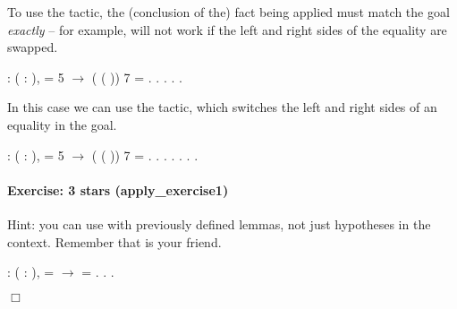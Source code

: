 \documentclass[12pt]{report}
\begin{document}
 To use the  tactic, the (conclusion of the) fact
    being applied must match the goal \textit{exactly} -- for example, 
    will not work if the left and right sides of the equality are
    swapped. \begin{coqdoccode}
\coqdocemptyline
\coqdocnoindent
{}  : \coqdockw{\ensuremath{\forall}} ( : ),\coqdoceol
\coqdocindent{2.50em}
 =   5  \ensuremath{\rightarrow}\coqdoceol
\coqdocindent{2.50em}
 ( ( )) 7 = .\coqdoceol
\coqdocnoindent
{}.\coqdoceol
\coqdocindent{1.00em}
  .\coqdoceol
\coqdocindent{1.00em}
.\coqdoceol
\coqdocnoindent
{}.\coqdoceol
\coqdocemptyline
\end{coqdoccode}
In this case we can use the  tactic, which switches the
    left and right sides of an equality in the goal. \begin{coqdoccode}
\coqdocemptyline
\coqdocnoindent
{}  : \coqdockw{\ensuremath{\forall}} ( : ),\coqdoceol
\coqdocindent{2.50em}
 =   5  \ensuremath{\rightarrow}\coqdoceol
\coqdocindent{2.50em}
 ( ( )) 7 = .\coqdoceol
\coqdocnoindent
{}.\coqdoceol
\coqdocindent{1.00em}
  .\coqdoceol
\coqdocindent{1.00em}
.\coqdoceol
\coqdocindent{1.00em}
. \coqdocindent{1.00em}
 . .\coqdoceol
\coqdocemptyline
\end{coqdoccode}
\paragraph{Exercise: 3 stars (apply\_exercise1)}

 Hint: you can use  with previously defined lemmas, not
    just hypotheses in the context.  Remember that  is
    your friend. \begin{coqdoccode}
\coqdocemptyline
\coqdocnoindent
{}  : \coqdockw{\ensuremath{\forall}} (  :  ),\coqdoceol
\coqdocindent{2.50em}
 =   \ensuremath{\rightarrow}\coqdoceol
\coqdocindent{2.50em}
 =  .\coqdoceol
\coqdocnoindent
{}.\coqdoceol
 .\coqdoceol
\end{coqdoccode}
\ensuremath{\Box} 
\end{document}
